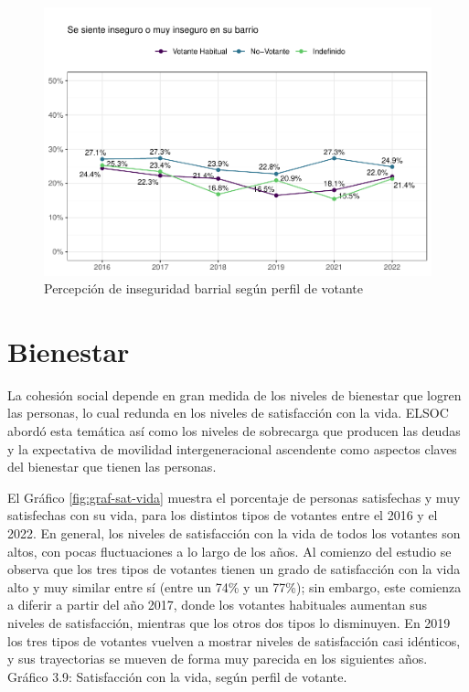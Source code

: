 \documentclass[
  12pt,
]{book}
\begin{document}
\begin{figure}

{\centering \includegraphics{reporte-elsoc_files/figure-latex/inseg-part-1} 

}

\caption{Percepción de inseguridad barrial según perfil de votante}\label{fig:inseg-part}
\end{figure}

\hypertarget{bienestar}{%
\section{Bienestar}\label{bienestar}}

La cohesión social depende en gran medida de los niveles de bienestar que logren las personas, lo cual redunda en los niveles de satisfacción con la vida. ELSOC abordó esta temática así como los niveles de sobrecarga que producen las deudas y la expectativa de movilidad intergeneracional ascendente como aspectos claves del bienestar que tienen las personas.

El Gráfico \ref{fig:graf-sat-vida} muestra el porcentaje de personas satisfechas y muy satisfechas con su vida, para los distintos tipos de votantes entre el 2016 y el 2022. En general, los niveles de satisfacción con la vida de todos los votantes son altos, con pocas fluctuaciones a lo largo de los años. Al comienzo del estudio se observa que los tres tipos de votantes tienen un grado de satisfacción con la vida alto y muy similar entre sí (entre un 74\% y un 77\%); sin embargo, este comienza a diferir a partir del año 2017, donde los votantes habituales aumentan sus niveles de satisfacción, mientras que los otros dos tipos lo disminuyen. En 2019 los tres tipos de votantes vuelven a mostrar niveles de satisfacción casi idénticos, y sus trayectorias se mueven de forma muy parecida en los siguientes años. Gráfico 3.9: Satisfacción con la vida, según perfil de votante.
\end{document}

